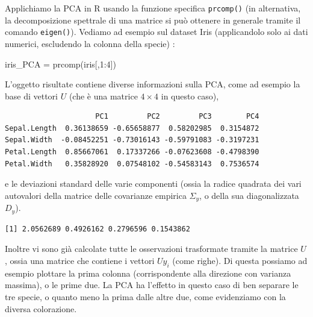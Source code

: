 \documentclass[
  italian,
  letterpaper,
]{book}
\newenvironment{Shaded}{\begin{snugshade}}{\end{snugshade}}
\newcommand{\DecValTok}[1]{\textcolor[rgb]{0.68,0.00,0.00}{#1}}
\newcommand{\FunctionTok}[1]{\textcolor[rgb]{0.28,0.35,0.67}{#1}}
\newcommand{\NormalTok}[1]{\textcolor[rgb]{0.00,0.23,0.31}{#1}}
\newcommand{\OtherTok}[1]{\textcolor[rgb]{0.00,0.23,0.31}{#1}}
\newcommand{\SpecialCharTok}[1]{\textcolor[rgb]{0.37,0.37,0.37}{#1}}
\theoremstyle{definition}
\theoremstyle{remark}
\begin{document}
Applichiamo la PCA in R usando la funzione specifica \texttt{prcomp()}
(in alternativa, la decomposizione spettrale di una matrice si può
ottenere in generale tramite il comando \texttt{eigen()}). Vediamo ad
esempio sul dataset Iris (applicandolo solo ai dati numerici, escludendo
la colonna della specie) :

\begin{Shaded}
\begin{Highlighting}[]
\NormalTok{iris\_PCA }\OtherTok{=} \FunctionTok{prcomp}\NormalTok{(iris[,}\DecValTok{1}\SpecialCharTok{:}\DecValTok{4}\NormalTok{])}
\end{Highlighting}
\end{Shaded}

L'oggetto risultate contiene diverse informazioni sulla PCA, come ad
esempio la base di vettori \(U\) (che è una matrice \(4\times 4\) in
questo caso),

\begin{Shaded}
\end{Shaded}

\begin{verbatim}
                     PC1         PC2         PC3        PC4
Sepal.Length  0.36138659 -0.65658877  0.58202985  0.3154872
Sepal.Width  -0.08452251 -0.73016143 -0.59791083 -0.3197231
Petal.Length  0.85667061  0.17337266 -0.07623608 -0.4798390
Petal.Width   0.35828920  0.07548102 -0.54583143  0.7536574
\end{verbatim}

e le deviazioni standard delle varie componenti (ossia la radice
quadrata dei vari autovalori della matrice delle covarianze empirica
\(\Sigma_y\), o della sua diagonalizzata \(D_y\)).

\begin{Shaded}
\end{Shaded}

\begin{verbatim}
[1] 2.0562689 0.4926162 0.2796596 0.1543862
\end{verbatim}

Inoltre vi sono già calcolate tutte le osservazioni trasformate tramite
la matrice \(U\), ossia una matrice che contiene i vettori \(Uy_i\)
(come righe). Di questa possiamo ad esempio plottare la prima colonna
(corrispondente alla direzione con varianza massima), o le prime due. La
PCA ha l'effetto in questo caso di ben separare le tre specie, o quanto
meno la prima dalle altre due, come evidenziamo con la diversa
colorazione.
\end{document}
